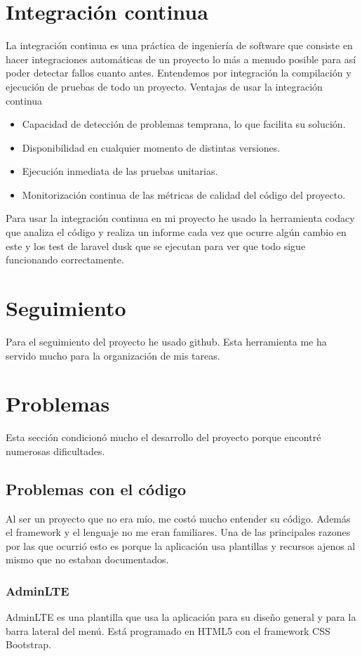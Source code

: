 \section{Integración continua}
La integración continua es una práctica de ingeniería de software que consiste en hacer integraciones automáticas de un proyecto lo más a menudo posible para así poder detectar fallos cuanto antes. Entendemos por integración la compilación y ejecución de pruebas de todo un proyecto.\cite{IntegraciónContinua}
Ventajas de usar la integración continua 
\begin{itemize}
    \item Capacidad de detección de problemas temprana, lo que facilita su solución.
    \item Disponibilidad en cualquier momento de distintas versiones.
    \item Ejecución inmediata de las pruebas unitarias.
    \item Monitorización continua de las métricas de calidad del código del proyecto.
\end{itemize}
Para usar la integración continua en mi proyecto he usado la herramienta codacy que analiza el código y realiza un informe cada vez que ocurre algún cambio en este y los test de laravel dusk que se ejecutan para ver que todo sigue funcionando correctamente.\\
\section{Seguimiento}
Para el seguimiento del proyecto he usado github. Esta herramienta me ha servido mucho para la organización de mis tareas.
\section{Problemas}
Esta sección condicionó mucho el desarrollo del proyecto porque encontré numerosas dificultades.
\subsection{Problemas con el código}
Al ser un proyecto que no era mío, me costó mucho entender su código. Además el framework y el lenguaje no me eran familiares. Una de las principales razones por las que ocurrió esto es porque la aplicación usa plantillas y recursos ajenos al mismo que no estaban documentados.
\subsubsection{AdminLTE}
AdminLTE es una plantilla que usa la aplicación para su diseño general y para la barra lateral del menú. Está programado en HTML5 con el framework CSS Bootstrap. 
